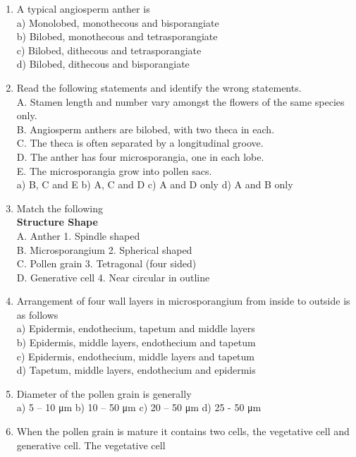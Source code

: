 \begin{enumerate}
\def\labelenumi{\arabic{enumi}.}
\setcounter{enumi}{90}
\item
  A typical angiosperm anther is\\
  a) Monolobed, monothecous and bisporangiate\\
  b) Bilobed, monothecous and tetrasporangiate\\
  c) Bilobed, dithecous and tetrasporangiate\\
  d) Bilobed, dithecous and bisporangiate
\item
  Read the following statements and identify the wrong statements.\\
  A. Stamen length and number vary amongst the flowers of the same
  species only.\\
  B. Angiosperm anthers are bilobed, with two theca in each.\\
  C. The theca is often separated by a longitudinal groove.\\
  D. The anther has four microsporangia, one in each lobe.\\
  E. The microsporangia grow into pollen sacs.\\
  a) B, C and E b) A, C and D c) A and D only d) A and B only
\item
  Match the following\\
  \textbf{Structure Shape}\\
  A. Anther 1. Spindle shaped\\
  B. Microsporangium 2. Spherical shaped\\
  C. Pollen grain 3. Tetragonal (four sided)\\
  D. Generative cell 4. Near circular in outline
\item
  Arrangement of four wall layers in microsporangium from inside to
  outside is as follows\\
  a) Epidermis, endothecium, tapetum and middle layers\\
  b) Epidermis, middle layers, endothecium and tapetum\\
  c) Epidermis, endothecium, middle layers and tapetum\\
  d) Tapetum, middle layers, endothecium and epidermis
\item
  Diameter of the pollen grain is generally\\
  a) 5 -- 10 μm b) 10 -- 50 μm c) 20 -- 50 μm d) 25 - 50 μm
\item
  When the pollen grain is mature it contains two cells, the vegetative
  cell and generative cell. The vegetative cell\\

\end{enumerate}
